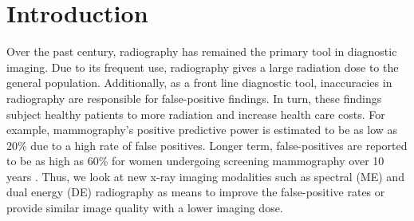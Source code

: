 \documentclass[a4paper,11pt]{article}
\begin{document}
\maketitle
%


\section{Introduction}

Over the past century, radiography has remained the primary tool in diagnostic imaging. Due to its frequent use, radiography gives a large radiation dose to the general population. Additionally, as a front line diagnostic tool, inaccuracies in radiography are responsible for false-positive findings. In turn, these findings subject healthy patients to more radiation and increase health care costs. For example, mammography's positive predictive power is estimated to be as low as 20\% \cite{Skaane2013ProspectiveArbitration., Dickersin2010TheCancer, Kopans1992TheMammography., Mushlin1998EstimatingMeta-analysis, Chiarelli2013DigitalProgram} due to a high rate of false positives. Longer term, false-positives are reported to be as high as 60\% for women undergoing screening mammography over 10 years \cite{Kerlikowske2013OutcomesTherapy, Hubbard2011CumulativeMammography}. Thus, we look at new x-ray imaging modalities such as spectral (ME) and dual energy (DE) radiography as means to improve the false-positive rates or provide similar image quality with a lower imaging dose.

\end{document}
